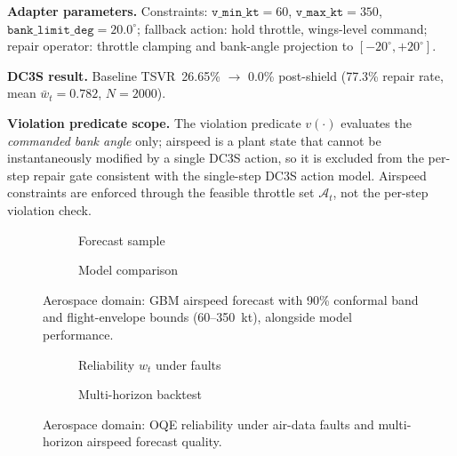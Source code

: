 \textbf{Adapter parameters.}
Constraints: $\mathtt{v\_min\_kt} = 60$, $\mathtt{v\_max\_kt} = 350$,
$\mathtt{bank\_limit\_deg} = 20.0^\circ$;
fallback action: hold throttle, wings-level command;
repair operator: throttle clamping and bank-angle projection to
$[-20^\circ, +20^\circ]$.

\textbf{DC3S result.}
Baseline TSVR~26.65\% $\rightarrow$ 0.0\% post-shield (77.3\% repair rate,
mean $\bar{w}_t = 0.782$, $N = 2000$).

\textbf{Violation predicate scope.}
The violation predicate $v(\cdot)$ evaluates the \emph{commanded bank angle}
only; airspeed is a plant state that cannot be instantaneously modified by a
single DC3S action, so it is excluded from the per-step repair gate consistent
with the single-step DC3S action model.  Airspeed constraints are enforced
through the feasible throttle set $\mathcal{A}_t$, not the per-step violation
check.

\begin{figure}[htbp]
  \centering
  \begin{subfigure}[b]{0.48\linewidth}
    \caption{Forecast sample}
  \end{subfigure}
  \hfill
  \begin{subfigure}[b]{0.48\linewidth}
    \caption{Model comparison}
  \end{subfigure}
  \caption{Aerospace domain: GBM airspeed forecast with 90\% conformal
    band and flight-envelope bounds (60--350~kt), alongside model performance.}
  \label{fig:aerospace-profile}
\end{figure}

\begin{figure}[htbp]
  \centering
  \begin{subfigure}[b]{0.48\linewidth}
    \caption{Reliability $w_t$ under faults}
  \end{subfigure}
  \hfill
  \begin{subfigure}[b]{0.48\linewidth}
    \caption{Multi-horizon backtest}
  \end{subfigure}
  \caption{Aerospace domain: OQE reliability under air-data faults and
    multi-horizon airspeed forecast quality.}
  \label{fig:aerospace-profile-2}
\end{figure}

